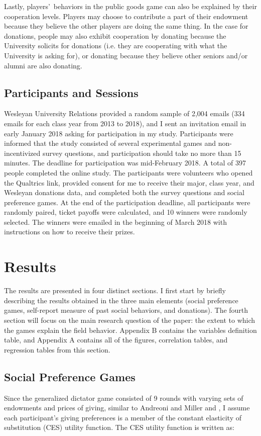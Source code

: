 \documentclass[12pt]{article}
\begin{document}
Lastly, players\rq \ behaviors in the public goods game can also be explained by their cooperation levels. Players may choose to contribute a part of their endowment because they believe the other players are doing the same thing. In the case for donations, people may also exhibit cooperation by donating because the University solicits for donations (i.e. they are cooperating with what the University is asking for), or donating because they believe other seniors and/or alumni are also donating.

	
\subsection{Participants and Sessions}

Wesleyan University Relations provided a random sample of 2,004 emails (334 emails for each class year from 2013 to 2018), and I sent an invitation email in early January 2018 asking for participation in my study. Participants were informed that the study consisted of several experimental games and non-incentivized survey questions, and participation should take no more than 15 minutes.  The deadline for participation was mid-February 2018. A total of 397 people completed the online study. The participants were volunteers who opened the Qualtrics link, provided consent for me to receive their major, class year, and Wesleyan donations data, and completed both the survey questions and social preference games. At the end of the participation deadline, all participants were randomly paired, ticket payoffs were calculated, and 10 winners were randomly selected. The winners were emailed  in the beginning of March 2018 with instructions on how to receive their prizes.

\section{Results}
The results are presented in four distinct sections. I first start by briefly describing the results obtained in the three main elements (social preference games, self-report measure of past social behaviors, and donations). The fourth section will focus on the main research question of the paper: the extent to which the games explain the field behavior. Appendix B contains the variables definition table, and Appendix A contains all of the figures, correlation tables, and regression tables from this section.

\subsection{Social Preference Games}
Since the generalized dictator game consisted of 9 rounds with varying sets of endowments and prices of giving, similar to Andreoni and Miller and \cite{fisman_kariv_markovits_2007}, I assume each participant\rq s giving preferences is a member of the constant elasticity of substitution (CES) utility function.  The CES utility function is written as:\\
\end{document}
